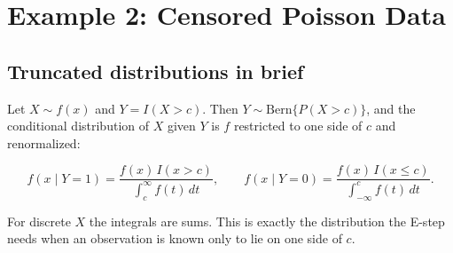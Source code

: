 \documentclass[
  letterpaper,
  DIV=11,
  numbers=noendperiod]{scrreprt}
\begin{document}
\section{Example 2: Censored Poisson Data}\label{sec-poisson}

\subsection{Truncated distributions in
brief}\label{truncated-distributions-in-brief}

Let \(X \sim f(x)\) and \(Y = I(X > c)\). Then
\(Y \sim \text{Bern}\{P(X > c)\}\), and the conditional distribution of
\(X\) given \(Y\) is \(f\) restricted to one side of \(c\) and
renormalized:

\[
f(x \mid Y = 1) = \frac{f(x)\, I(x > c)}{\int_c^{\infty} f(t)\,dt},
\qquad
f(x \mid Y = 0) = \frac{f(x)\, I(x \le c)}{\int_{-\infty}^{c} f(t)\,dt} .
\]

For discrete \(X\) the integrals are sums. This is exactly the
distribution the E-step needs when an observation is known only to lie
on one side of \(c\).
\end{document}
